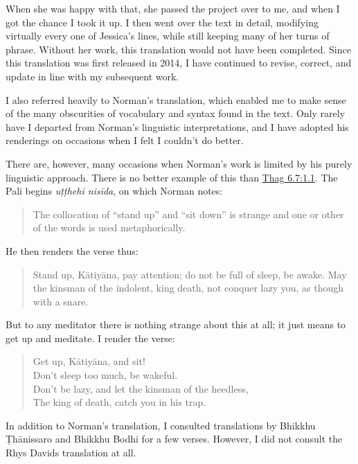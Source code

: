 \documentclass[12pt,openany]{book}%
\begin{document}
When she was happy with that, she passed the project over to me, and when I got the chance I took it up. I then went over the text in detail, modifying virtually every one of Jessica’s lines, while still keeping many of her turns of phrase. Without her work, this translation would not have been completed. Since this translation was first released in 2014, I have continued to revise, correct, and update in line with my subsequent work.

I also referred heavily to Norman’s translation, which enabled me to make sense of the many obscurities of vocabulary and syntax found in the text. Only rarely have I departed from Norman’s linguistic interpretations, and I have adopted his renderings on occasions when I felt I couldn’t do better.

There are, however, many occasions when Norman’s work is limited by his purely linguistic approach. There is no better example of this than \href{https://suttacentral.net/thag6.7/en/sujato\#1.1}{Thag 6.7:1.1}. The Pali begins \textit{\textsanskrit{uṭṭhehi} \textsanskrit{nisīda}}, on which Norman notes:

\begin{quotation}%
The collocation of “stand up” and “sit down” is strange and one or other of the words is used metaphorically.

%
\end{quotation}

He then renders the verse thus:

\begin{quotation}%
Stand up, \textsanskrit{Kātiyāna}, pay attention; do not be full of sleep, be awake. May the kinsman of the indolent, king death, not conquer lazy you, as though with a snare.

%
\end{quotation}

But to any meditator there is nothing strange about this at all; it just means to get up and meditate. I render the verse:

\begin{verse}%
Get up, \textsanskrit{Kātiyāna}, and sit! \\
Don’t sleep too much, be wakeful. \\
Don’t be lazy, and let the kinsman of the heedless, \\
The king of death, catch you in his trap.

%
\end{verse}

In addition to Norman’s translation, I consulted translations by Bhikkhu \textsanskrit{Ṭhānissaro} and Bhikkhu Bodhi for a few verses. However, I did not consult the Rhys Davids translation at all.
\end{document}
